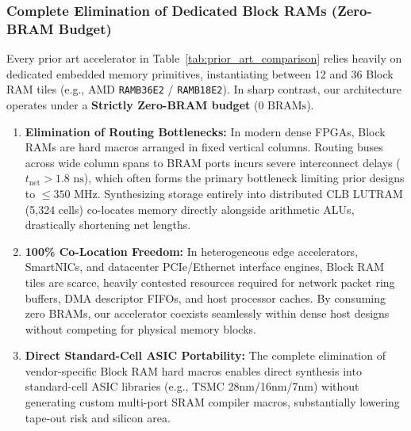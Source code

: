 \subsubsection{Complete Elimination of Dedicated Block RAMs (Zero-BRAM Budget)}
Every prior art accelerator in Table~\ref{tab:prior_art_comparison} relies heavily on dedicated embedded memory primitives, instantiating between 12 and 36 Block RAM tiles (e.g., AMD \texttt{RAMB36E2} / \texttt{RAMB18E2}). In sharp contrast, our architecture operates under a \textbf{Strictly Zero-BRAM budget} ($0\text{ BRAMs}$).
\begin{enumerate}
    \item \textbf{Elimination of Routing Bottlenecks:} In modern dense FPGAs, Block RAMs are hard macros arranged in fixed vertical columns. Routing buses across wide column spans to BRAM ports incurs severe interconnect delays ($t_{\text{net}} > 1.8\text{ ns}$), which often forms the primary bottleneck limiting prior designs to $\le 350\text{ MHz}$. Synthesizing storage entirely into distributed CLB LUTRAM (5,324 cells) co-locates memory directly alongside arithmetic ALUs, drastically shortening net lengths.
    \item \textbf{100\% Co-Location Freedom:} In heterogeneous edge accelerators, SmartNICs, and datacenter PCIe/Ethernet interface engines, Block RAM tiles are scarce, heavily contested resources required for network packet ring buffers, DMA descriptor FIFOs, and host processor caches. By consuming zero BRAMs, our accelerator coexists seamlessly within dense host designs without competing for physical memory blocks.
    \item \textbf{Direct Standard-Cell ASIC Portability:} The complete elimination of vendor-specific Block RAM hard macros enables direct synthesis into standard-cell ASIC libraries (e.g., TSMC 28nm/16nm/7nm) without generating custom multi-port SRAM compiler macros, substantially lowering tape-out risk and silicon area.
\end{enumerate}

